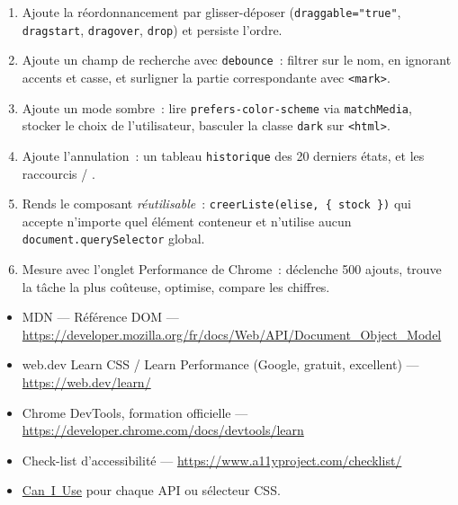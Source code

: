 \documentclass[12pt,a4paper,twoside,openright]{book}
\newcommand{\link}[2]{\href{#2}{#1}}
\DeclareRobustCommand{\clic}[1]{\textcolor{linkblue}{\textsf{#1}}}
\begin{document}
\begin{exercice}
\begin{enumerate}
  \item Ajoute la r\'eordonnancement par glisser-d\'eposer (\verb|draggable="true"|,
        \verb|dragstart|, \verb|dragover|, \verb|drop|) et persiste l'ordre.
  \item Ajoute un champ de recherche avec \verb|debounce|~: filtrer sur le nom, en ignorant
        accents et casse, et surligner la partie correspondante avec \verb|<mark>|.
  \item Ajoute un mode sombre~: lire \verb|prefers-color-scheme| via
        \verb|matchMedia|, stocker le choix de l'utilisateur, basculer la classe
        \verb|dark| sur \verb|<html>|.
  \item Ajoute l'annulation~: un tableau \verb|historique| des 20 derniers \'etats, et les
        raccourcis  / .
  \item Rends le composant \emph{r\'eutilisable}~: \verb|creerListe(elise, { stock })| qui
        accepte n'importe quel \'el\'ement conteneur et n'utilise aucun \verb|document.querySelector| global.
  \item Mesure avec l'onglet \clic{Performance} de Chrome~: d\'eclenche 500 ajouts, trouve la
        t\^ache la plus co\^uteuse, optimise, compare les chiffres.
\end{enumerate}
\end{exercice}

\begin{ressources}
\begin{itemize}
  \item MDN --- R\'ef\'erence DOM --- \url{https://developer.mozilla.org/fr/docs/Web/API/Document_Object_Model}
  \item web.dev Learn CSS / Learn Performance (Google, gratuit, excellent) --- \url{https://web.dev/learn/}
  \item Chrome DevTools, formation officielle --- \url{https://developer.chrome.com/docs/devtools/learn}
  \item Check-list d'accessibilit\'e --- \url{https://www.a11yproject.com/checklist/}
  \item \link{Can~I~Use}{https://caniuse.com/} pour chaque API ou s\'electeur CSS.
\end{itemize}
\end{ressources}

\end{document}
